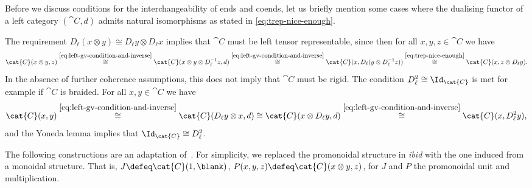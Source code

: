 \begin{remark}\label{rmk:conditions-for-early-properties}
  Before we discuss conditions for the interchangeability of ends and coends,
  let us briefly mention some cases where the dualising functor of a left \GV{} category \((\cat{C}, d)\)
  admits natural isomorphisms as stated in \cref{eq:trep-nice-enough}.

  The requirement \(D_{\ell}(x \otimes y) \cong D_{\ell}y \otimes D_{\ell}x\) implies that \(\cat{C}\) must be left tensor repre\-sentable,
  since then for all \(x,y, z \in\cat{C}\) we have
  \[
    \cat{C}(x \otimes y, z)
    \overset{\eqref{eq:left-gv-condition-and-inverse}}{\cong}
    \cat{C}(x \otimes y \otimes D_{\ell}^{-1}z, d)
    \overset{\eqref{eq:left-gv-condition-and-inverse}}{\cong}
    \cat{C}(x, D_{\ell}(y \otimes D_{\ell}^{-1}z))
    \overset{\eqref{eq:trep-nice-enough}}{\cong}
    \cat{C}(x,z \otimes  D_{\ell}y).
  \]
  In the absence of further coherence assumptions,
  this does not imply that \(\cat{C}\) must be rigid.
  The condition \(D_{\ell}^2 \cong \Id_{\cat{C}}\) is met for example if \(\cat{C}\) is braided.
  For all \(x, y \in\cat{C}\) we have
  \[
    \cat{C}(x, y)
    \overset{\eqref{eq:left-gv-condition-and-inverse}}{\cong}
    \cat{C}(D_{\ell}y \otimes x,d)
    \cong
    \cat{C}(x \otimes D_{\ell}y  ,d)
    \overset{\eqref{eq:left-gv-condition-and-inverse}}{\cong}
    \cat{C}(x, D_{\ell}^2 y),
  \]
  and the Yoneda lemma implies that \(\Id_{\cat{C}} \cong D_{\ell}^2\).
\end{remark}

The following constructions are an adaptation of~\cite{day06:compac}.
For simplicity, we replaced the promonoidal structure in \emph{ibid}
with the one induced from a monoidal structure.
That is, \(J \defeq \cat{C}(1, \blank )\), \(P(x, y, z) \defeq \cat{C}(x \otimes y, z)\),
for \(J\) and \(P\) the pro\-mon\-oidal unit and multiplication.

